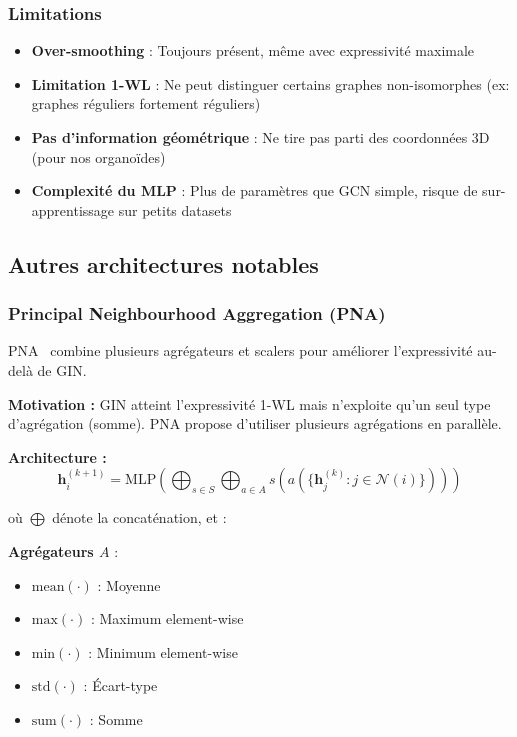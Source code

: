\subsubsection{Limitations}

\begin{itemize}
    \item \textbf{Over-smoothing} : Toujours présent, même avec expressivité maximale
    \item \textbf{Limitation 1-WL} : Ne peut distinguer certains graphes non-isomorphes (ex: graphes réguliers fortement réguliers)
    \item \textbf{Pas d'information géométrique} : Ne tire pas parti des coordonnées 3D (pour nos organoïdes)
    \item \textbf{Complexité du MLP} : Plus de paramètres que GCN simple, risque de sur-apprentissage sur petits datasets
\end{itemize}

\subsection{Autres architectures notables}

\subsubsection{Principal Neighbourhood Aggregation (PNA)}

PNA~\cite{Corso2020} combine plusieurs agrégateurs et scalers pour améliorer l'expressivité au-delà de GIN.

\textbf{Motivation :}
GIN atteint l'expressivité 1-WL mais n'exploite qu'un seul type d'agrégation (somme). PNA propose d'utiliser plusieurs agrégations en parallèle.

\textbf{Architecture :}
\[
\mathbf{h}_i^{(k+1)} = \text{MLP}\left(\bigoplus_{s \in S} \bigoplus_{a \in A} s\left(a\left(\{\mathbf{h}_j^{(k)} : j \in \mathcal{N}(i)\}\right)\right)\right)
\]

où $\bigoplus$ dénote la concaténation, et :

\textbf{Agrégateurs $A$} :
\begin{itemize}
    \item $\text{mean}(\cdot)$ : Moyenne
    \item $\text{max}(\cdot)$ : Maximum element-wise
    \item $\text{min}(\cdot)$ : Minimum element-wise
    \item $\text{std}(\cdot)$ : Écart-type
    \item $\text{sum}(\cdot)$ : Somme
\end{itemize}

